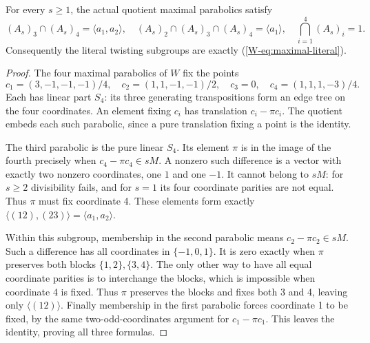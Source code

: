\begin{lemma}\label{W-lem:literal}
For every $s\geq1$, the actual quotient maximal parabolics satisfy
\[
 (A_s)_3\cap(A_s)_4=\langle a_1,a_2\rangle,\quad
 (A_s)_2\cap(A_s)_3\cap(A_s)_4=\langle a_1\rangle,\quad
 \bigcap_{i=1}^4(A_s)_i=1.
\]
Consequently the literal twisting subgroups are exactly
(\ref{W-eq:maximal-literal}).
\end{lemma}
\begin{proof}
The four maximal parabolics of $W$ fix the points
\[
 c_1=(3,-1,-1,-1)/4,\quad c_2=(1,1,-1,-1)/2,
 \quad c_3=0,\quad c_4=(1,1,1,-3)/4.
\]
Each has linear part $S_4$: its three generating transpositions form
an edge tree on the four coordinates. An element fixing $c_i$ has
translation $c_i-\pi c_i$. The quotient embeds each such parabolic,
since a pure translation fixing a point is the identity.

The third parabolic is the pure linear $S_4$. Its element $\pi$
is in the image of the fourth precisely when
$c_4-\pi c_4\in sM$. A nonzero such difference is a vector with
exactly two nonzero coordinates, one $1$ and one $-1$. It cannot
belong to $sM$: for $s\geq2$ divisibility fails, and for $s=1$
its four coordinate parities are not equal. Thus $\pi$ must fix
coordinate 4. These elements form exactly
$\langle(12),(23)\rangle=\langle a_1,a_2\rangle$.

Within this subgroup, membership in the second parabolic means
$c_2-\pi c_2\in sM$. Such a difference has all coordinates in
$\{-1,0,1\}$. It is zero exactly when $\pi$ preserves both
blocks $\{1,2\},\{3,4\}$. The only other way to have all
equal coordinate parities is to interchange the blocks, which is
impossible when coordinate 4 is fixed. Thus $\pi$ preserves the
blocks and fixes both 3 and 4, leaving only $\langle(12)\rangle$.
Finally membership in the first parabolic forces coordinate 1 to
be fixed, by the same two-odd-coordinates argument for
$c_1-\pi c_1$. This leaves the identity, proving all three formulas.
\end{proof}

